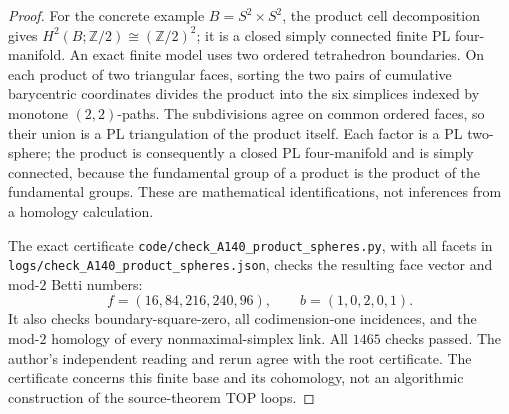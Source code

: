 \begin{proof}
For the concrete example $B=S^2\times S^2$, the product cell
decomposition gives $H^2(B;\mathbb Z/2)\cong(\mathbb Z/2)^2$;
it is a closed simply connected finite PL four-manifold. An exact
finite model uses two ordered tetrahedron boundaries. On each
product of two triangular faces, sorting the two pairs of cumulative
barycentric coordinates divides the product into the six simplices
indexed by monotone $(2,2)$-paths. The subdivisions agree on common
ordered faces, so their union is a PL triangulation of the product
itself. Each factor is a PL two-sphere; the product is consequently
a closed PL four-manifold and is simply connected, because the
fundamental group of a product is the product of the fundamental
groups. These are mathematical identifications, not inferences
from a homology calculation.

The exact certificate
\texttt{code/check\_A140\_product\_spheres.py}, with all facets
in \texttt{logs/check\_A140\_product\_spheres.json}, checks the
resulting face vector and mod-$2$ Betti numbers:
\[
 f=(16,84,216,240,96),\qquad b=(1,0,2,0,1).
\]
It also checks boundary-square-zero, all codimension-one incidences,
and the mod-$2$ homology of every nonmaximal-simplex link.
All $1465$ checks passed. The author's independent reading and
rerun agree with the root certificate.
The certificate concerns this finite base and its cohomology,
not an algorithmic construction of the source-theorem TOP loops.
\end{proof}
